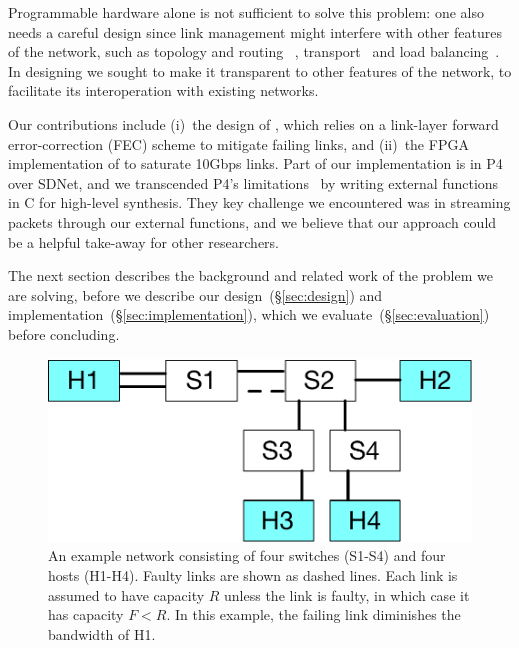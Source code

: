 Programmable hardware alone is not sufficient to solve this problem: one
also needs a careful design since link management might interfere with
other features of the network, such as topology and routing~
\cite{Greenberg:2011:VSF:1897852.1897877,
NiranjanMysore:2009:PSF:1594977.1592575,
Agarwal:2014:SMS:2620728.2620758},
transport~\cite{Raiciu:2011:IDP:2043164.2018467,Alizadeh:2010:DCT:1851275.1851192}
and load balancing~\cite{Alizadeh:2014:CDC:2740070.2626316}.
In designing \OurSys we sought to make it transparent to other
features of the network, to facilitate its interoperation with
existing networks.

Our contributions include (i)~the design of \OurSys, which relies on a
link-layer forward error-correction (FEC) scheme to mitigate failing
links, and (ii)~the FPGA implementation of \OurSys to saturate 10Gbps
links. Part of our implementation is in
P4~\cite{Bosshart:2014:PPP:2656877.2656890} over SDNet, and we
transcended P4's limitations~\cite{Dang:2017:WPL:3050220.3050231} by
writing external functions in C for high-level synthesis.
They key challenge we encountered was in streaming packets through our
external functions, and we believe that our approach could be a
helpful take-away for other researchers.

The next section describes the background and related work of the problem we
are solving, before we describe our design~(\S\ref{sec:design}) and
implementation~(\S\ref{sec:implementation}), which we
evaluate~(\S\ref{sec:evaluation}) before concluding.

\begin{figure}
  \centering
  \includegraphics[width=0.3\paperwidth]{example_network.pdf}
  \caption{\label{fig:example-net}An example network consisting of four
    switches (S1-S4) and four hosts (H1-H4). Faulty links are shown as dashed lines.
    Each link is assumed to have capacity $R$ unless the link is faulty, in
    which case it has capacity $F < R$.  In this example, the failing link
    diminishes the bandwidth of H1.}
\end{figure}
